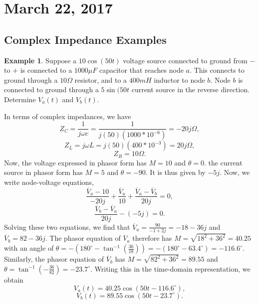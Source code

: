 \documentclass[11pt]{article}
\theoremstyle{plain} %
\theoremstyle{definition}
\theoremstyle{example}
\newtheorem*{example}{Example}
\theoremstyle{remark}
\newcommand{\degree}{^{\circ}}
\begin{document}
\section{March 22, 2017}

\subsection{Complex Impedance Examples}
\begin{example}
Suppose a $10\cos(50t)$ voltage source connected to ground from $-$ to $+$ is connected to a $1000\mu F$ capacitor that reaches node $a$. This connects to ground through a $10\Omega$ resistor, and to a $400mH$ inductor to node $b$. Node $b$ is connected to ground through a $5\sin(50t$ current source in the reverse direction. Determine $V_a(t)$ and $V_b(t)$. 
\end{example}

In terms of complex impedances, we have 
$$Z_C = \frac{1}{j\omega c} = \frac{1}{j(50)\left(1000*10^{-6}\right)} = -20j\Omega,$$
$$Z_L = j\omega L = j(50)\left(400*10^{-3}\right)  = 20j\Omega,$$
$$Z_R = 10\Omega.$$
Now, the voltage expressed in phasor form has $M = 10$ and $\theta = 0$. the current source in phasor form has $M = 5$ and $\theta = -90$. It is thus given by $-5j$. Now, we write node-voltage equations,
$$\frac{\overline{V}_a-10}{-20j} + \frac{\overline{V}_a}{10} + \frac{\overline V_a- \overline V_b}{20j} = 0,$$
$$\frac{\overline V_b - \overline V_a}{20j} -(-5j) = 0.$$
Solving these two equations, we find that $\overline V_a = \frac{90}{-1+2j} =-18-36j$ and $\overline V_b = 82-36j$. The phasor equation of $\overline V_a$ therefore has $M = \sqrt{18^2+36^2}=40.25$ with an angle of $\theta = -\left(180^{\circ}-\tan^{-1}\left(\frac{36}{18}\right)\right) = -\left(180\degree        -63.4\degree\right) = -116.6\degree$. Similarly, the phasor equation of $\overline V_b$ has $M = \sqrt{82^2+36^2} = 89.55$ and $\theta = \tan^{-1}\left(-\frac{36}{82}\right) = -23.7\degree$. Writing this in the time-domain representation, we obtain 
$$V_a(t) = 40.25\cos\left(50t -116.6\degree\right),$$
$$V_b(t) = 89.55\cos\left(50t - 23.7\degree\right).$$
\end{document}
